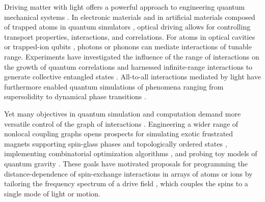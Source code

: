 \documentclass[aps,pra,superscriptaddress,12pt]{revtex4-1} %
\begin{document}
\begin{bibunit}
\begin{abstract}
\end{abstract}
\date{8 June 2021 }


\maketitle
\newpage

Driving matter with light offers a powerful approach to engineering quantum mechanical systems \cite{rudner2020band,kennedy2015observation,aidelsburger2015measuring,struck2013engineering,vaidya2018tunable,islam2013emergence,jurcevic2014quasiparticle,fausti2011light,wang2013observation,leroux2010implementation,barontini2015deterministic,bohnet2016quantum,hosten2016measurement,welte2018photon,pedrozo2020entanglement,davis2019photon,davis2020protecting,muniz2020exploring,leonard2017supersolid}.  In electronic materials \cite{fausti2011light,wang2013observation} and in artificial materials composed of trapped atoms in quantum simulators \cite{rudner2020band,kennedy2015observation,aidelsburger2015measuring,struck2013engineering,vaidya2018tunable}, optical driving allows for controlling transport properties, interactions, and correlations.  For atoms in optical cavities \cite{vaidya2018tunable} or trapped-ion qubits \cite{islam2013emergence,jurcevic2014quasiparticle}, photons or phonons can mediate interactions of tunable range.  Experiments have investigated the influence of the range of interactions on the growth of quantum correlations \cite{islam2013emergence,jurcevic2014quasiparticle} and harnessed infinite-range interactions to generate collective entangled states \cite{leroux2010implementation,barontini2015deterministic,bohnet2016quantum,hosten2016measurement,welte2018photon,pedrozo2020entanglement}.  All-to-all interactions mediated by light have furthermore enabled quantum simulations of phenomena ranging from supersolidity \cite{leonard2017supersolid} to dynamical phase transitions \cite{muniz2020exploring}.

Yet many objectives in quantum simulation and computation demand more versatile control of the graph of interactions \cite{gopalakrishnan2011frustration,strack2011dicke,hung2016quantum,bentsen2019treelike,belyansky2020minimal,ozeri2020quantum}.  Engineering a wider range of nonlocal coupling graphs opens prospects for simulating exotic frustrated magnets supporting spin-glass phases \cite{strack2011dicke,gopalakrishnan2011frustration} and topologically ordered states \cite{hung2016quantum}, implementing combinatorial optimization algorithms \cite{mcmahon2016fully,berloff2017realizing,marsh2021enhancing,anikeeva2020number}, and probing toy models of quantum gravity \cite{bentsen2019treelike,belyansky2020minimal,kollar2019hyperbolic}.  These goals have motivated proposals for programming the distance-dependence of spin-exchange interactions in arrays of atoms or ions by tailoring the frequency spectrum of a drive field \cite{hung2016quantum,bentsen2019treelike,ozeri2020quantum}, which couples the spins to a single mode of light or motion.  



\end{bibunit}
\end{document}
